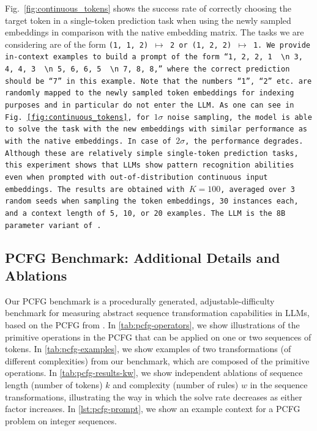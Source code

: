 Fig.~\ref{fig:continuous_tokens} shows the success rate of correctly choosing the target token in a single-token prediction task when using the newly sampled embeddings in comparison with the native embedding matrix.
The tasks we are considering are of the form \tt{(1, 1, 2) $\mapsto$ 2} or \tt{(1, 2, 2) $\mapsto$ 1}.
We provide in-context examples to build a prompt of the form ``\tt{1, 2, 2, 1 ~\textbackslash n 3, 4, 4, 3 ~\textbackslash n 5, 6, 6, 5 ~\textbackslash n 7, 8, 8,}'' where the correct prediction should be ``\tt{7}'' in this example.
Note that the numbers ``\tt{1}'', ``\tt{2}'' etc. are randomly mapped to the newly sampled token embeddings for indexing purposes and in particular do not enter the LLM.
As one can see in Fig.~\ref{fig:continuous_tokens}, for $1\sigma$ noise sampling, the model is able to solve the task with the new embeddings with similar performance as with the native embeddings.
In case of $2\sigma$, the performance degrades.
Although these are relatively simple single-token prediction tasks, this experiment shows that LLMs show pattern recognition abilities even when prompted with out-of-distribution continuous input embeddings.
The results are obtained with $K=100$, averaged over 3 random seeds when sampling the token embeddings, 30 instances each, and a context length of 5, 10, or 20 examples. The LLM is the 8B parameter variant of \cite{chowdhery2022palm}.

\subsection{PCFG Benchmark: Additional Details and Ablations}
\label{app:pcfg-kw}

Our PCFG benchmark is a procedurally generated, adjustable-difficulty benchmark for measuring abstract sequence transformation capabilities in LLMs, based on the PCFG from \cite{hupkes2020compositionality}. In \cref{tab:pcfg-operators}, we show illustrations of the primitive operations in the PCFG that can be applied on one or two sequences of tokens. In \cref{tab:pcfg-examples}, we show examples of two transformations (of different complexities) from our benchmark, which are composed of the primitive operations.  In \cref{tab:pcfg-results-kw}, we show independent ablations of sequence length (number of tokens) $k$ and complexity (number of rules) $w$ in the sequence transformations, illustrating the way in which the solve rate decreases as either factor increases. In \cref{lst:pcfg-prompt}, we show an example context for a PCFG problem on integer sequences.

